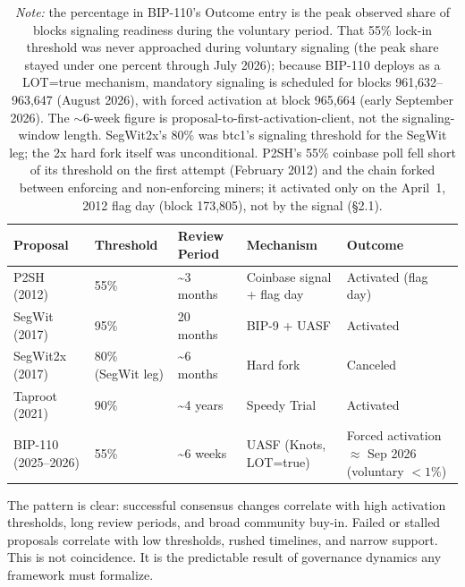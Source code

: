 \documentclass[11pt, twoside, openright]{book}
\newcommand{\sect}[1]{\S#1}
\begin{document}
\begin{table}[H]
\centering
\small
\begin{tabularx}{\textwidth}{@{}l l l l >{\raggedright\arraybackslash}X@{}}
\toprule
\textbf{Proposal} & \textbf{Threshold} & \textbf{Review Period} & \textbf{Mechanism} & \textbf{Outcome} \\
\midrule
P2SH (2012)        & 55\%        & \textasciitilde 3 months  & Coinbase signal + flag day & Activated (flag day) \\
SegWit (2017)      & 95\%        & 20 months                 & BIP-9 + UASF               & Activated \\
SegWit2x (2017)    & 80\% (SegWit leg)  & \textasciitilde 6 months  & Hard fork                  & Canceled \\
Taproot (2021)     & 90\%        & \textasciitilde 4 years   & Speedy Trial               & Activated \\
BIP-110 (2025--2026) & 55\%        & \textasciitilde 6 weeks   & UASF (Knots, LOT=true)     & Forced activation ${\approx}$ Sep 2026 (voluntary $<1\%$) \\
\bottomrule
\end{tabularx}
\caption*{\small\textit{Note:} the percentage in BIP-110's Outcome entry is the peak observed share of blocks signaling readiness during the voluntary period. That 55\% lock-in threshold was never approached during voluntary signaling (the peak share stayed under one percent through July 2026); because BIP-110 deploys as a LOT=true mechanism, mandatory signaling is scheduled for blocks 961{,}632--963{,}647 (August 2026), with forced activation at block 965{,}664 (early September 2026). The ${\sim}6$-week figure is proposal-to-first-activation-client, not the signaling-window length. SegWit2x's 80\% was btc1's signaling threshold for the SegWit leg; the 2x hard fork itself was unconditional. P2SH's 55\% coinbase poll fell short of its threshold on the first attempt (February 2012) and the chain forked between enforcing and non-enforcing miners; it activated only on the April~1, 2012 flag day (block 173{,}805), not by the signal (\sect{2.1}).}
\end{table}

The pattern is clear: successful consensus changes correlate with high activation thresholds, long review periods, and broad community buy-in. Failed or stalled proposals correlate with low thresholds, rushed timelines, and narrow support. This is not coincidence. It is the predictable result of governance dynamics any framework must formalize.
\end{document}
